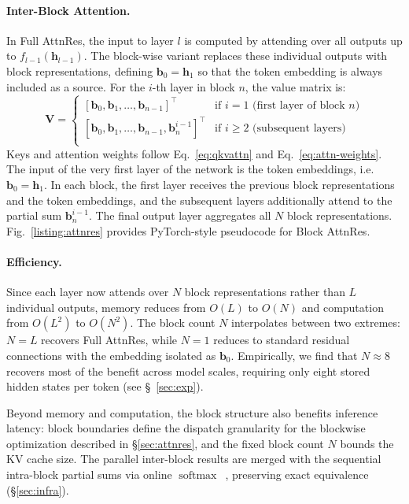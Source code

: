 \paragraph{Inter-Block Attention.}
In Full AttnRes, the input to layer $l$ is computed by attending over all outputs up to $f_{l-1}(\bm{h}_{l-1})$.
The block-wise variant replaces these individual outputs with block representations, defining $\bm{b}_0 = \bm{h}_1$ so that the token embedding is always included as a source.
For the $i$-th layer in block $n$, the value matrix is:
\begin{equation}
    \mathbf{V} = \begin{cases}
        [\bm{b}_0, \bm{b}_1, \ldots, \bm{b}_{n-1}]^\top                 & \text{if } i = 1 \text{ (first layer of block } n\text{)} \\
        [\bm{b}_0, \bm{b}_1, \ldots, \bm{b}_{n-1}, \bm{b}_n^{i-1}]^\top & \text{if } i \geq 2 \text{ (subsequent layers)}           \\
    \end{cases}
\end{equation}
Keys and attention weights follow Eq.~\ref{eq:qkvattn} and Eq.~\ref{eq:attn-weights}.
The input of the very first layer of the network is the token embeddings, i.e. $\bm{b}_0 = \bm{h}_1$. In each block, the first layer receives the previous block representations and the token embeddings, and the subsequent layers additionally attend to the partial sum $\bm{b}_n^{i-1}$. The final output layer aggregates all $N$ block representations.
Fig.~\ref{listing:attnres} provides PyTorch-style pseudocode for Block AttnRes.


\paragraph{Efficiency.}
Since each layer now attends over $N$ block representations rather than $L$ individual outputs, memory reduces from $O(L)$ to $O(N)$ and computation from $O(L^2)$ to $O(N^2)$.
The block count $N$ interpolates between two extremes: $N = L$ recovers Full AttnRes, while $N = 1$ reduces to standard residual connections with the embedding isolated as $\bm{b}_0$.
Empirically, we find that $N \approx 8$ recovers most of the benefit across model scales, requiring only eight stored hidden states per token (see \S~\ref{sec:exp}).

Beyond memory and computation, the block structure also benefits inference latency: block boundaries define the dispatch granularity for the blockwise optimization described in \S\ref{sec:attnres}, and the fixed block count $N$ bounds the KV cache size. The parallel inter-block results are merged with the sequential intra-block partial sums via online $\operatorname{softmax}$~\citep{milakov2018online}, preserving exact equivalence (\S\ref{sec:infra}).
